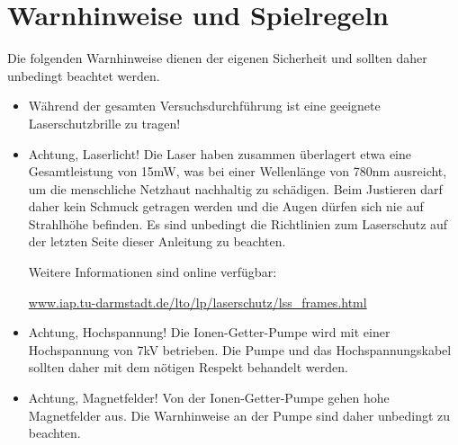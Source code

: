 \documentclass[
class=book,
accentcolor=1b,
custommargins=geometry,
fontsize=11pt,
thesis={type=Versuchsanleitung},
ruledheaders=all,
headline=false,
instbox=false,
marginpar=false,
title=small,
ignore-missing-data=true,
twoside=false,
logofile=apqdesign/tuda_logo.pdf,
pdfa=false %
]{apqpub}
\begin{document}
	\submissiondate{\today}
	\examdate{\today} %
	
	
	\maketitle
	\frontmatter
	
	 
	\tableofcontents
	
	\mainmatter
	\setcounter{page}{1}
	
	
	
	
\section{Warnhinweise und Spielregeln}

Die folgenden Warnhinweise dienen der eigenen Sicherheit und sollten daher unbedingt beachtet werden.

\begin{itemize}
	\item Während der gesamten Versuchsdurchführung ist eine geeignete Laserschutzbrille zu tragen!
	
	\item Achtung, Laserlicht! Die Laser haben zusammen überlagert etwa eine Gesamtleistung von 15mW, was bei
	einer Wellenlänge von 780nm ausreicht, um die menschliche Netzhaut nachhaltig zu schädigen. Beim Justieren
	darf daher kein Schmuck getragen werden und die Augen dürfen sich nie auf Strahlhöhe befinden.
	Es sind unbedingt die Richtlinien zum Laserschutz auf der letzten Seite dieser Anleitung zu beachten.
	
	Weitere Informationen sind online verfügbar:
	
	\url{www.iap.tu-darmstadt.de/lto/lp/laserschutz/lss_frames.html}
	
	\item Achtung, Hochspannung! Die Ionen-Getter-Pumpe wird mit einer Hochspannung von 7kV betrieben. Die
	Pumpe und das Hochspannungskabel sollten daher mit dem nötigen Respekt behandelt werden.
	
	\item Achtung, Magnetfelder! Von der Ionen-Getter-Pumpe gehen hohe Magnetfelder aus. Die Warnhinweise an
	der Pumpe sind daher unbedingt zu beachten.
\end{itemize}
\end{document}
